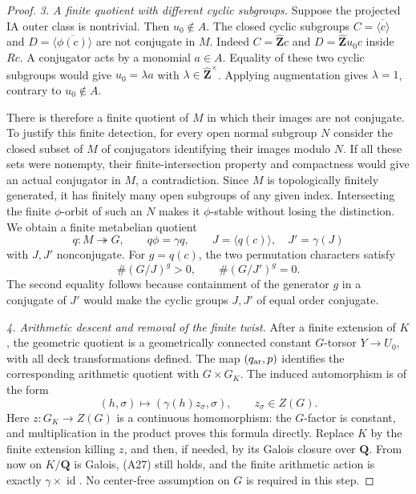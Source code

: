 \begin{proof}
\emph{3. A finite quotient with different cyclic subgroups.}
Suppose the projected IA outer class is nontrivial.
Then $u_0\notin A$. The closed cyclic subgroups
$C=\overline{\langle c\rangle}$ and
$D=\overline{\langle\phi(c)\rangle}$ are not conjugate
in $M$. Indeed $C=\widehat{\mathbf Z}c$ and
$D=\widehat{\mathbf Z}u_0c$ inside $Rc$. A conjugator
acts by a monomial $a\in A$. Equality of these two
cyclic subgroups would give $u_0=\lambda a$ with
$\lambda\in\widehat{\mathbf Z}^{\times}$.
Applying augmentation gives $\lambda=1$, contrary to
$u_0\notin A$.

There is therefore a finite quotient of $M$ in which
their images are not conjugate. To justify this
finite detection, for every open normal subgroup $N$
consider the closed subset of $M$ of conjugators
identifying their images modulo $N$. If all these
sets were nonempty, their finite-intersection property
and compactness would give an actual conjugator in
$M$, a contradiction. Since $M$ is topologically
finitely generated, it has finitely many open subgroups
of any given index. Intersecting the finite $\phi$-orbit
of such an $N$ makes it $\phi$-stable without losing
the distinction. We obtain a finite metabelian quotient
\[
 q:M\twoheadrightarrow G,\qquad q\phi=\gamma q,
 \qquad J=\langle q(c)\rangle,
 \quad J'=\gamma(J)
\]
with $J,J'$ nonconjugate. For $g=q(c)$, the two
permutation characters satisfy
\[
                 \#(G/J)^g>0,\qquad \#(G/J')^g=0.           \tag{A28}
\]
The second equality follows because containment of the
generator $g$ in a conjugate of $J'$ would make the
cyclic groups $J,J'$ of equal order conjugate.

\emph{4. Arithmetic descent and removal of the finite twist.}
After a finite extension of $K$, the geometric quotient
is a geometrically connected constant $G$-torsor
$Y\to U_0$, with all deck transformations defined.
The map $(q_{\rm ar},p)$ identifies the corresponding
arithmetic quotient with $G\times G_K$.
The induced automorphism is of the form
\[
                 (h,\sigma)\longmapsto
                         (\gamma(h)z_\sigma,\sigma),
                 \qquad z_\sigma\in Z(G).
\]
Here $z:G_K\to Z(G)$ is a continuous homomorphism:
the $G$-factor is constant, and multiplication in the
product proves this formula directly. Replace $K$ by
the finite extension killing $z$, and then, if needed,
by its Galois closure over $\mathbf Q$. From now on
$K/\mathbf Q$ is Galois, (A27) still holds, and the
finite arithmetic action is exactly
$\gamma\times\operatorname{id}$. No center-free
assumption on $G$ is required in this step.


\end{proof}
